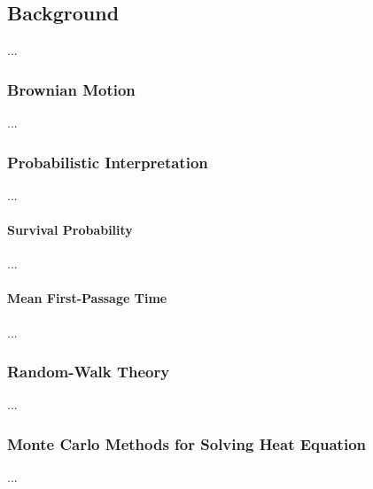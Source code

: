 
\subsection{Background}

...

\subsubsection{Brownian Motion}

...


\subsubsection{Probabilistic Interpretation}

...


\paragraph{Survival Probability}

...


\paragraph{Mean First-Passage Time}


...


\subsubsection{Random-Walk Theory}

...

\subsubsection{Monte Carlo Methods for Solving Heat Equation}

...











